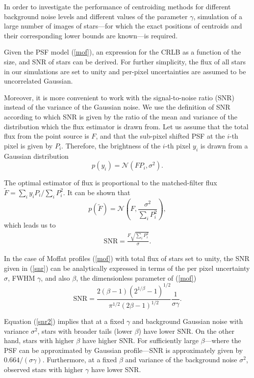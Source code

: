 \documentclass[onecolumn]{aastex61}
\newcommand{\beq}{\begin{equation}}
\newcommand{\eeq}{\end{equation}}
\newcommand{\todo}[1]{{\textcolor{dred}{ #1}}}
\begin{document}
In order to investigate the performance of centroiding methods for
 different background noise levels and different
values of the parameter $\gamma$, simulation of a large number of images of stars---for which the exact positions of centroids
and their corresponding lower bounds are known---is required.


Given the PSF model (\ref{mof}), an expression for the CRLB as a function of the size, and SNR of stars can be 
derived. For further simplicity, the flux of all stars in our simulations are set to unity and per-pixel 
uncertainties are assumed to be uncorrelated Gaussian.

Moreover, it is more convenient to work with the signal-to-noise ratio
(SNR) instead of the variance of the Gaussian noise.
We use the definition of SNR according to which SNR is given by the ratio
 of the mean and variance of the distribution
which the flux estimator is drawn from. Let us assume that the total flux from
the point source is $F$, and that the sub-pixel shifted PSF at the $i$-th pixel is given
by $P_{i}$. Therefore, the brightness of the $i$-th pixel $y_{i}$ is drawn from
a Gaussian distribution 
\beq
p(y_{i}) = \mathcal{N}(FP_{i},\sigma^{2}). 
\eeq

\todo{The optimal estimator of flux is proportional to the matched-filter flux
$\tilde{F}=\sum_{i}y_{i}P_{i}/\sum_{i}P_{i}^{2}$.} It can be shown that 
\beq
p(\tilde{F}) = \mathcal{N}(F , \frac{\sigma^{2}}{\sum_{i}P_{i}^{2}}),
\eeq  
which leads us to
\beq
\begin{array}{l}
\text{SNR} = \frac{F\sqrt{\sum_{i} P_{i}^{2}}}{\sigma}.
\end{array}
\label{snr}
\eeq

 In the case of Moffat profiles (\ref{mof}) with total flux of stars set to unity, 
the SNR given in (\ref{snr}) can be analytically 
expressed in terms of the per pixel uncertainty
$\sigma$, FWHM $\gamma$, and also $\beta$, \todo{the dimensionless parameter of (\ref{mof})}
\beq
\text{SNR} = \frac{2(\beta-1)(2^{1/\beta}-1)^{1/2}}{\pi^{1/2}(2\beta-1)^{1/2}}\frac{1}{\sigma \gamma}.
\label{snr2}
\eeq

Equation (\ref{snr2}) implies that at a fixed $\gamma$ and background Gaussian noise 
with variance $\sigma^{2}$, stars with broader tails (lower $\beta$) have lower SNR.
On the other hand, stars with higher $\beta$ have higher SNR. 
For sufficiently large $\beta$---where the PSF can be
approximated by Gaussian profile---SNR is approximately given by $0.664/(\sigma\gamma)$.
Furthermore, at a fixed $\beta$ and variance of the background noise $\sigma^{2}$,
observed stars with higher $\gamma$ have lower SNR.  
\end{document}
